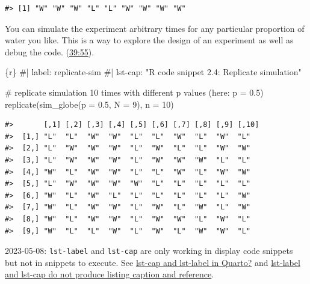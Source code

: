 \documentclass[
  letterpaper,
  DIV=11,
  numbers=noendperiod]{scrreprt}
\newenvironment{Shaded}{\begin{snugshade}}{\end{snugshade}}
\newcommand{\AttributeTok}[1]{\textcolor[rgb]{0.40,0.45,0.13}{#1}}
\newcommand{\CommentTok}[1]{\textcolor[rgb]{0.37,0.37,0.37}{#1}}
\newcommand{\DecValTok}[1]{\textcolor[rgb]{0.68,0.00,0.00}{#1}}
\newcommand{\FloatTok}[1]{\textcolor[rgb]{0.68,0.00,0.00}{#1}}
\newcommand{\FunctionTok}[1]{\textcolor[rgb]{0.28,0.35,0.67}{#1}}
\newcommand{\InformationTok}[1]{\textcolor[rgb]{0.37,0.37,0.37}{#1}}
\newcommand{\NormalTok}[1]{\textcolor[rgb]{0.00,0.23,0.31}{#1}}
\begin{document}
\begin{verbatim}
#> [1] "W" "W" "W" "L" "L" "W" "W" "W" "W"
\end{verbatim}

You can simulate the experiment arbitrary times for any particular
proportion of water you like. This is a way to explore the design of an
experiment as well as debug the code.
(\href{https://www.youtube.com/watch?v=R1vcdhPBlXA&list=PLDcUM9US4XdPz-KxHM4XHt7uUVGWWVSus&index=2&t=39m55s}{39:55}).

\begin{Shaded}
\begin{Highlighting}[]
\InformationTok{\textasciigrave{}\textasciigrave{}\textasciigrave{}\{r\}}
\CommentTok{\#| label: replicate{-}sim}
\CommentTok{\#| lst{-}cap: "R code snippet 2.4: Replicate simulation"}

\CommentTok{\# replicate simulation 10 times with different p values (here: p = 0.5)}
\FunctionTok{replicate}\NormalTok{(}\FunctionTok{sim\_globe}\NormalTok{(}\AttributeTok{p =} \FloatTok{0.5}\NormalTok{, }\AttributeTok{N =} \DecValTok{9}\NormalTok{), }\AttributeTok{n =} \DecValTok{10}\NormalTok{) }
\InformationTok{\textasciigrave{}\textasciigrave{}\textasciigrave{}}
\end{Highlighting}
\end{Shaded}

\begin{verbatim}
#>       [,1] [,2] [,3] [,4] [,5] [,6] [,7] [,8] [,9] [,10]
#>  [1,] "L"  "L"  "W"  "W"  "L"  "L"  "W"  "L"  "W"  "L"  
#>  [2,] "L"  "W"  "W"  "W"  "L"  "W"  "L"  "L"  "W"  "W"  
#>  [3,] "L"  "W"  "W"  "W"  "L"  "W"  "W"  "W"  "L"  "L"  
#>  [4,] "W"  "L"  "W"  "W"  "L"  "L"  "W"  "L"  "W"  "W"  
#>  [5,] "L"  "W"  "W"  "W"  "W"  "L"  "L"  "L"  "L"  "L"  
#>  [6,] "W"  "L"  "W"  "L"  "L"  "L"  "L"  "L"  "L"  "W"  
#>  [7,] "W"  "L"  "W"  "W"  "L"  "W"  "L"  "W"  "L"  "W"  
#>  [8,] "W"  "L"  "W"  "W"  "L"  "W"  "W"  "L"  "W"  "L"  
#>  [9,] "W"  "L"  "L"  "W"  "L"  "W"  "L"  "W"  "W"  "L"
\end{verbatim}

\begin{tcolorbox}[enhanced jigsaw, colframe=quarto-callout-warning-color-frame, colback=white, toprule=.15mm, breakable, arc=.35mm, bottomtitle=1mm, colbacktitle=quarto-callout-warning-color!10!white, toptitle=1mm, titlerule=0mm, title=\textcolor{quarto-callout-warning-color}{\faExclamationTriangle}\hspace{0.5em}{Quarto cannot list \& execute code in the same chunk}, leftrule=.75mm, opacityback=0, rightrule=.15mm, opacitybacktitle=0.6, bottomrule=.15mm, left=2mm, coltitle=black]

2023-05-08: \texttt{lst-label} and \texttt{lst-cap} are only working in
display code snippets but not in snippets to execute. See
\href{https://community.rstudio.com/t/lst-cap-and-lst-label-in-quarto/157173}{lst-cap
and lst-label in Quarto?} and
\href{https://github.com/quarto-dev/quarto-cli/issues/1580}{lst-label
and lst-cap do not produce listing caption and reference}.

\end{tcolorbox}
\end{document}
